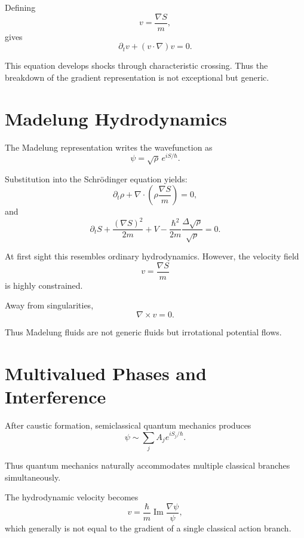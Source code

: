 \documentclass[11pt]{article}
\begin{document}
Defining
\[
v=\frac{\nabla S}{m},
\]
gives
\begin{equation}
\partial_t v + (v\cdot\nabla)v=0.
\end{equation}

This equation develops shocks through characteristic crossing. Thus the breakdown of the gradient representation is not exceptional but generic.

\section{Madelung Hydrodynamics}

The Madelung representation writes the wavefunction as
\begin{equation}
\psi=\sqrt{\rho}\,e^{iS/\hbar}.
\end{equation}

Substitution into the Schr\"odinger equation yields:
\begin{equation}
\partial_t \rho
+
\nabla\cdot
\left(
\rho\frac{\nabla S}{m}
\right)
=
0,
\label{continuity}
\end{equation}
and
\begin{equation}
\partial_t S
+
\frac{(\nabla S)^2}{2m}
+
V
-
\frac{\hbar^2}{2m}
\frac{\Delta\sqrt{\rho}}{\sqrt{\rho}}
=
0.
\label{madelungHJ}
\end{equation}

At first sight this resembles ordinary hydrodynamics. However, the velocity field
\[
v=\frac{\nabla S}{m}
\]
is highly constrained.

Away from singularities,
\begin{equation}
\nabla\times v=0.
\end{equation}

Thus Madelung fluids are not generic fluids but irrotational potential flows.

\section{Multivalued Phases and Interference}

After caustic formation, semiclassical quantum mechanics produces
\begin{equation}
\psi
\sim
\sum_j
A_j e^{iS_j/\hbar}.
\end{equation}

Thus quantum mechanics naturally accommodates multiple classical branches simultaneously.

The hydrodynamic velocity becomes
\begin{equation}
v
=
\frac{\hbar}{m}
\operatorname{Im}
\frac{\nabla\psi}{\psi},
\end{equation}
which generally is not equal to the gradient of a single classical action branch.
\end{document}
